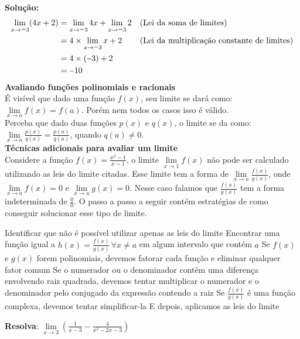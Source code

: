 \documentclass[12pt,a4paper,brazil]{article}
\newcommand{\minus}{\scalebox{0.75}[1.0]{$-$}}
\begin{document}
\textbf{Solução:}
\begin{equation*}
	\begin{aligned}
		\lim\limits_{x \to \minus3} (4x + 2)
		&= \lim\limits_{x \to \minus3} 4x + \lim\limits_{x \to \minus3} 2 & & \text{(Lei da soma de limites)} \\
		&= 4 \times \lim\limits_{x \to \minus3} x + 2 & & \text{(Lei da multiplicação constante de limites)} \\
		&= 4 \times (\minus3) + 2 \\
		&= \minus10
	\end{aligned}
\end{equation*}
\textbf{Avaliando funções polinomiais e racionais} \\
É visível que dado uma função $f(x)$, seu limite se dará como:
$\lim\limits_{x \to a} f(x) = f(a)$. Porém nem todos os casos isso é válido. \\
Perceba que dado duas funções $p(x)$ e $q(x)$, o limite se da como:
$\lim\limits_{x \to a} \frac{p(x)}{q(x)} = \frac{p(a)}{q(a)}$, quando $q(a) \neq 0$.
\vspace{5mm} \\ %
\textbf{Técnicas adicionais para avaliar um limite} \\
Considere a função $f(x) = \frac{x^2 - 1}{x - 1}$, o limite $\lim\limits_{x \to 1} f(x)$
não pode ser calculado utilizando as leis do limite citadas. Esse limite tem a forma de
$\lim\limits_{x \to a} \frac{f(x)}{g(x)}$, onde $\lim\limits_{x \to a} f(x) = 0$ e $\lim\limits_{x \to a} g(x) = 0$.
Nesse caso falamos que $\frac{f(x)}{g(x)}$ tem a forma indeterminada de $\frac{0}{0}$.
O passo a passo a seguir contém estratégias de como conseguir solucionar esse tipo de limite.
\begin{outline}[enumerate]
	\1 Identificar que não é possível utilizar apenas as leis do limite
	\1 Encontrar uma função igual a $h(x) = \frac{f(x)}{g(x)}\,\forall x \neq a$ em algum intervalo que contém $a$
	\2 Se $f(x)$ e $g(x)$ forem polinomiais, devemos fatorar cada função e eliminar qualquer fator comum
	\2 Se o numerador ou o denominador contêm uma diferença envolvendo raiz quadrada, devemos tentar multiplicar
	o numerador e o denominador pelo conjugado da expressão contendo a raiz
	\2 Se $\frac{f(x)}{g(x)}$ é uma função complexa, devemos tentar simplificar-la
	\1 E depois, aplicamos as leis do limite
\end{outline}
\vspace{5mm} %
\textbf{Resolva}: $\lim\limits_{x \to 3} (\frac{1}{x - 3} - \frac{4}{x^2 - 2x - 3})$
\end{document}
